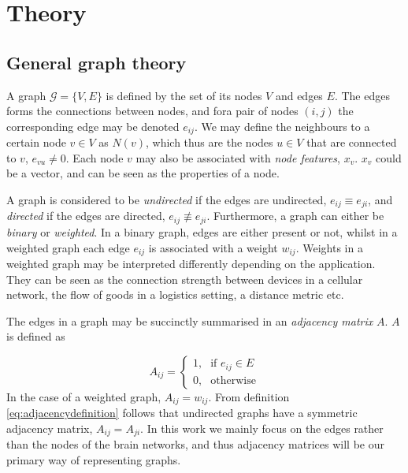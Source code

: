 \chapter{Theory}

\section{General graph theory}

A graph $\mathcal{G} = \{V, E \} $ is defined by the set of its nodes $V$ and edges $E$. The edges forms the connections between nodes, and fora pair of nodes $(i,j)$ the corresponding edge may be denoted $e_{ij}$. We may define the neighbours to a certain node $v \in V$ as $N(v)$, which thus are the nodes $u \in V$ that are connected to $v$, $e_{vu} \neq 0$. Each node $v$ may also be associated with \textit{node features}, $x_v$. $x_v$ could be a vector, and can be seen as the properties of a node.

A graph is considered to be \textit{undirected} if the edges are undirected, $e_{ij} \equiv e_{ji}$, and \textit{directed} if the edges are directed, $e_{ij} \not\equiv e_{ji}$. Furthermore, a graph can either be \textit{binary} or \textit{weighted}. In a binary graph, edges are either present or not, whilst in a weighted graph each edge $e_{ij}$ is associated with a weight $w_{ij}$. \cite{source} Weights in a weighted graph may be interpreted differently depending on the application. They can be seen as the connection strength between devices in a cellular network, the flow of goods in a logistics setting, a distance metric etc.

The edges in a graph may be succinctly summarised in an \textit{adjacency matrix} $A$. $A$ is defined as

\begin{equation}
    A_{ij} = \begin{cases} \mbox{1,} & \mbox{if } e_{ij} \in E \\ \mbox{0,} & \mbox{otherwise} \end{cases}
    \label{eq:adjacencydefinition}
\end{equation}
In the case of a weighted graph, $A_{ij} = w_{ij}$. From definition \eqref{eq:adjacencydefinition} follows that undirected graphs have a symmetric adjacency matrix, $A_{ij} = A_{ji}$. In this work we mainly focus on the edges rather than the nodes of the brain networks, and thus adjacency matrices will be our primary way of representing graphs.



